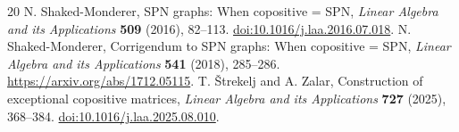 \begin{thebibliography}{20}
 N. Shaked-Monderer, SPN graphs: When copositive = SPN, \emph{Linear Algebra and its Applications} \textbf{509} (2016), 82--113. \href{https://doi.org/10.1016/j.laa.2016.07.018}{doi:10.1016/j.laa.2016.07.018}.
 N. Shaked-Monderer, Corrigendum to SPN graphs: When copositive = SPN, \emph{Linear Algebra and its Applications} \textbf{541} (2018), 285--286. \url{https://arxiv.org/abs/1712.05115}.
 T. \v Strekelj and A. Zalar, Construction of exceptional copositive matrices, \emph{Linear Algebra and its Applications} \textbf{727} (2025), 368--384. \href{https://doi.org/10.1016/j.laa.2025.08.010}{doi:10.1016/j.laa.2025.08.010}.
\end{thebibliography}
